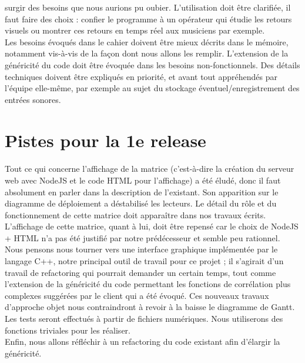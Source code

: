 \documentclass[a4paper]{article}
\begin{document}
surgir des besoins que nous aurions pu oubier. L'utilisation doit être clarifiée, il
faut faire des choix : confier le programme à un opérateur qui étudie les retours
visuels ou montrer ces retours en temps réel aux musiciens par exemple. \\
Les besoins évoqués dans le cahier doivent être mieux décrits dans le mémoire,
notamment vis-à-vis de la façon dont nous allons les remplir. L'extension de la 
généricité du code doit être évoquée dans les besoins non-fonctionnels. Des détails
techniques doivent être expliqués en priorité, et avant tout appréhendés par l'équipe
elle-même, par exemple au sujet du stockage éventuel/enregistrement des entrées sonores.


\section*{Pistes pour la 1e release}
\paragraph{}
Tout ce qui concerne l'affichage de la matrice (c'est-à-dire la création du
serveur web avec NodeJS et le code HTML pour l'affichage) a été éludé, donc il
faut absolument en parler dans la description de l'existant. Son apparition sur
le diagramme de déploiement a déstabilisé les lecteurs. Le détail du rôle et du
fonctionnement de cette matrice doit apparaître dans nos travaux écrits. \\
L'affichage de cette matrice, quant à lui, doit être repensé car le choix de 
NodeJS + HTML n'a pas été justifié par notre prédécesseur et semble peu rationnel.
Nous pensons nous tourner vers une interface graphique implémentée par le langage
C++, notre principal outil de travail pour ce projet ; il s'agirait d'un travail de
refactoring qui pourrait demander un certain temps, tout comme l'extension de la
généricité du code permettant les fonctions de corrélation plus complexes suggérées par
le client qui a été évoqué. Ces nouveaux travaux d'approche objet nous contraindront à
revoir à la baisse le diagramme de Gantt. \\
Les tests seront effectués à partir de fichiers numériques. Nous utiliserons des
fonctions triviales pour les réaliser. \\
Enfin, nous allons réfléchir à un refactoring du code existant afin d'élargir
la généricité.
\end{document}
